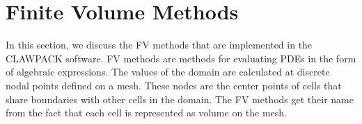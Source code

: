\section{Finite Volume Methods}
In this section, we discuss the FV methods that are implemented in the CLAWPACK software. FV methods are methods for evaluating PDEs in the form of algebraic expressions. The values of the domain are calculated at discrete nodal points defined on a mesh. These nodes are the center points of cells that share boundaries with other cells in the domain. The FV methods get their name from the fact that each cell is represented as volume on the mesh.


